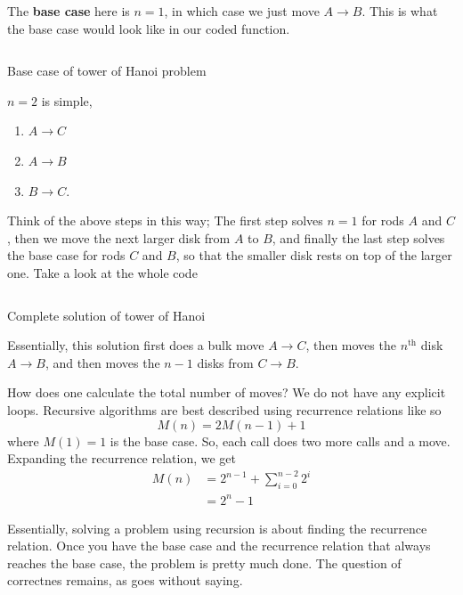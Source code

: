 \documentclass[a4paper]{article}
\newenvironment{code}{\captionsetup{type=listing}}{}
\begin{document}
The \textbf{base case} here is $n = 1$, in which case we just move
$A \to  B$. This is what the base case would look like in our
coded function.
\begin{code}
\inputminted[samepage=false, breaklines, linenos, firstline=1, lastline=11]{c}{codes/recursion/hanoi.c}
\label{lst:hanoi_basecase}
\caption{Base case of tower of Hanoi problem}
\end{code}

$n=2$ is simple, 
\begin{enumerate}
	\item $A\to C$
	\item  $A\to B$ 
	\item $B\to C$.
\end{enumerate}

Think of the above steps in this way; The first step solves $n=1$ for
rods $A$ and $C$, then we move the next larger disk from $A$ to $B$, and finally the
last step solves the base case for rods  $C$ and $B$, so that the
smaller disk rests on top of the larger one. Take a look at the whole
code
\begin{code}
\inputminted[samepage=false, breaklines, linenos]{c}{codes/recursion/hanoi.c}
\label{lst:hanoi_full}
\caption{Complete solution of tower of Hanoi}
\end{code}

Essentially, this solution first does a bulk move $A\to C$, then moves
the $n ^{\text{th}}$ disk $A\to B$, and then moves the $n-1$ disks 
from $C\to B$.

How does one calculate the total number of moves? We do not have
any explicit loops. Recursive algorithms are best described
using recurrence relations like so
\begin{equation}
	M(n) = 2M(n-1) + 1
\end{equation}
where $M(1) = 1$ is the base case. So, each call does two more calls
and a move. Expanding the recurrence relation, we get
\begin{equation}
	\begin{split}
		M(n) &= 2^{n-1} + \sum_{i=0}^{n-2} 2^{i}\\
		&= 2^{n} - 1
	\end{split}
\end{equation}

Essentially, solving a problem using recursion is about finding
the recurrence relation. Once you have the base case and the
recurrence relation that always reaches the base case, the problem
is pretty much done. The question of correctnes remains, as goes
without saying.
\end{document}
